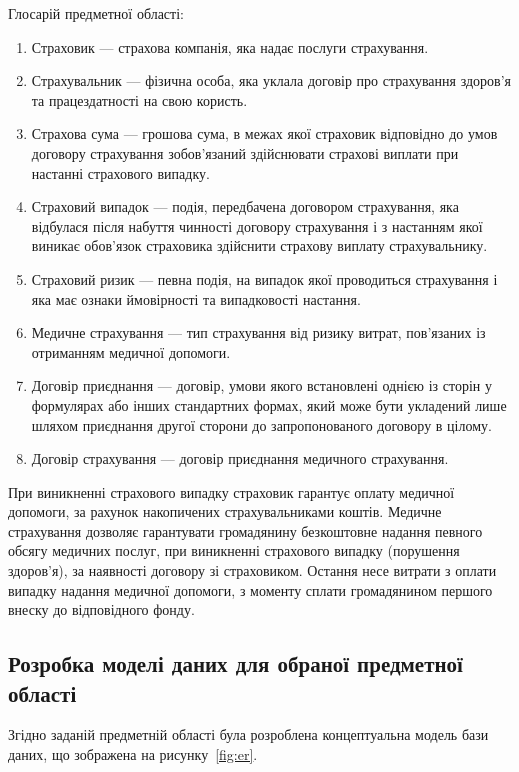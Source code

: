 Глосарій предметної області:
\begin{enumerate}
  \item Страховик --- страхова компанія, яка надає послуги страхування. 
  \item Страхувальник --- фізична особа, яка уклала договір про страхування здоров'я та працездатності на свою користь.
  \item Страхова сума --- грошова сума, в межах якої страховик відповідно до умов договору страхування зобов'язаний здійснювати страхові виплати при настанні страхового випадку. 
  \item Страховий випадок --- подія, передбачена договором страхування, яка відбулася після набуття чинності договору страхування і з настанням якої виникає обов'язок страховика здійснити страхову виплату страхувальнику.
  \item Страховий ризик --- певна подія, на випадок якої проводиться страхування і яка має ознаки ймовірності та випадковості настання.
  \item Медичне страхування --- тип страхування від ризику витрат, пов'язаних із отриманням медичної допомоги.
  \item Договір приєднання --- договір, умови якого встановлені однією із сторін у формулярах або інших стандартних формах, який може бути укладений лише шляхом приєднання другої сторони до запропонованого договору в цілому. 
  \item Договір страхування --- договір приєднання медичного страхування. 
\end{enumerate}

При виникненні страхового випадку страховик гарантує оплату медичної допомоги, за рахунок накопичених страхувальниками коштів. 
Медичне страхування дозволяє гарантувати громадянину безкоштовне надання певного обсягу медичних послуг, при виникненні страхового випадку (порушення здоров'я), за наявності договору зі страховиком. 
Остання несе витрати з оплати випадку надання медичної допомоги, з моменту сплати громадянином першого внеску до відповідного фонду.

\subsection*{Розробка моделі даних для обраної предметної області}
Згідно заданій предметній області була розроблена концептуальна модель бази даних, що зображена на рисунку~\ref{fig:er}.

